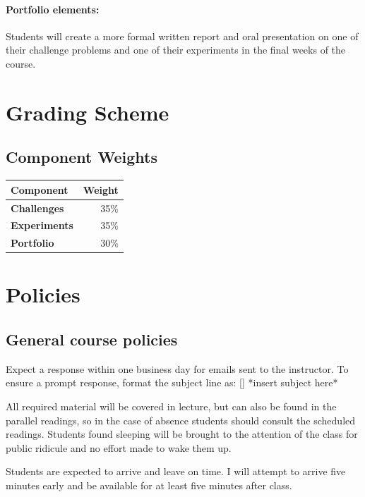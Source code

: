\documentclass{syllabus}
\begin{document}
\paragraph{Portfolio elements:} Students will create a more formal written report and oral presentation on one of their challenge problems and one of their experiments in the final weeks of the course.

\section*{Grading Scheme}
\subsection*{Component Weights}

\noindent\begin{tabular}{lr}
\textbf{Component} & \textbf{Weight}       \\ \hline
\textbf{Challenges}      & 35\%  \\
\textbf{Experiments}           & 35\%       \\
\textbf{Portfolio}            & 30\%     
\end{tabular}%






\section*{Policies}
\subsection{General course policies}
Expect a response within one business day for emails sent to the instructor. To ensure a prompt response, format the subject line as: [\coursecode] *insert subject here*

All required material will be covered in lecture, but can also be found in the parallel readings, so in the case of absence students should consult the scheduled readings. Students found sleeping will be brought to the attention of the class for public ridicule and no effort made to wake them up.

Students are expected to arrive and leave on time. I will attempt to arrive five minutes early and be available for at least five minutes after class.


\end{document}
